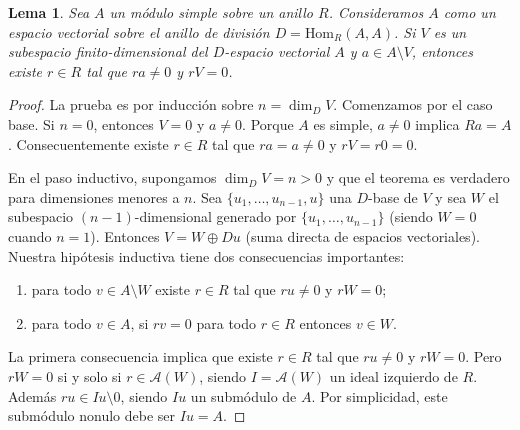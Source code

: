 \documentclass{report}
\newcommand{\Hom}{\text{Hom}}
\newtheorem{lemma}{Lema}
\begin{document}
  \begin{lemma}
    Sea \(A\) un módulo simple sobre un anillo \(R\).
    Consideramos \(A\) como un espacio vectorial sobre el anillo de división \(D = \Hom_R(A, A)\).
    Si \(V\) es un subespacio finito-dimensional del \(D\)-espacio vectorial \(A\) y \(a \in A \setminus V\), entonces existe \(r \in R\) tal que \(r a \neq 0\) y \(r V = 0\).
  \end{lemma}
  \begin{proof}
    La prueba es por inducción sobre \(n = \dim_D V\).
    Comenzamos por el caso base.
    Si \(n = 0\), entonces \(V = 0\) y \(a \neq 0\).
    Porque \(A\) es simple, \(a \neq 0\) implica \(R a = A\).
    Consecuentemente existe \(r \in R\) tal que \(r a = a \neq 0\) y \(r V = r 0 = 0\).

    En el paso inductivo, supongamos \(\dim_D V = n > 0\) y que el teorema es verdadero para dimensiones menores a \(n\).
    Sea \(\{u_1, \dots, u_{n - 1}, u\}\) una \(D\)-base de \(V\) y sea \(W\) el subespacio \((n - 1)\)-dimensional generado por \(\{u_1, \dots, u_{n - 1}\}\) (siendo \(W = 0\) cuando \(n = 1\)).
    Entonces \(V = W \oplus D u\) (suma directa de espacios vectoriales).
    Nuestra hipótesis inductiva tiene dos consecuencias importantes:
    \begin{enumerate}
      \item para todo \(v \in A \setminus W\) existe \(r \in R\) tal que \(r u \neq 0\) y \(r W = 0\);
      \item para todo \(v \in A\), si \(r v = 0\) para todo \(r \in R\) entonces \(v \in W\).
    \end{enumerate}
    La primera consecuencia implica que existe \(r \in R\) tal que \(r u \neq 0\) y \(r W = 0\).
    Pero \(r W = 0\) si y solo si \(r \in \mathcal{A}(W)\), siendo \(I = \mathcal{A}(W)\) un ideal izquierdo de \(R\).
    Además \(r u \in I u \setminus 0\), siendo \(I u\) un submódulo de \(A\).
    Por simplicidad, este submódulo nonulo debe ser \(I u = A\).


\end{proof}
\end{document}
